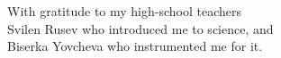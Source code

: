 \thispagestyle{empty}
{}

\vspace*{3cm}

\begin{center}
    With gratitude to my high-school teachers\\
    Svilen Rusev who introduced me to science, and\\
    Biserka Yovcheva who instrumented me for it.
\end{center}

\medskip
